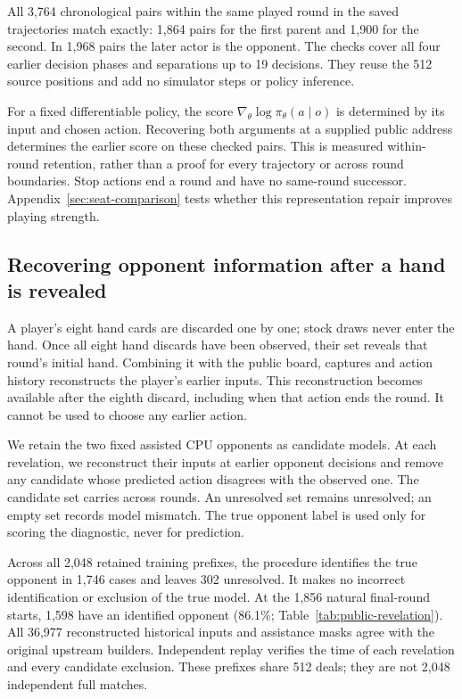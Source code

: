 All 3,764 chronological pairs within the same played round in the saved
trajectories match exactly: 1,864 pairs for the first parent and 1,900 for the
second. In 1,968 pairs the later actor is the opponent. The checks cover all
four earlier decision phases and separations up to 19 decisions. They reuse
the 512 source positions and add no simulator steps or policy inference.

For a fixed differentiable policy, the score
$\nabla_\theta\log\pi_\theta(a\mid o)$ is determined by its input and chosen
action. Recovering both arguments at a supplied public address determines the
earlier score on these checked pairs. This is measured within-round retention, rather than a
proof for every trajectory or across round boundaries. Stop actions end a round
and have no same-round successor. Appendix~\ref{sec:seat-comparison} tests whether this representation repair
improves playing strength.

\begin{samepage}
\subsection{Recovering opponent information after a hand is revealed}
\label{sec:public-revelation}
A player's eight hand cards are discarded one by one; stock draws never enter
the hand. Once all eight hand discards have been observed, their set reveals
that round's initial hand. Combining it with the public board, captures and
action history reconstructs the player's earlier inputs. This reconstruction
becomes available after the eighth discard, including when that action ends
the round. It cannot be used to choose any earlier action.
\end{samepage}

We retain the two fixed assisted CPU opponents as candidate models. At each
revelation, we reconstruct their inputs at earlier opponent decisions and
remove any candidate whose predicted action disagrees with the observed one.
The candidate set carries across rounds. An unresolved set remains unresolved;
an empty set records model mismatch. The true opponent label is used only for
scoring the diagnostic, never for prediction.

Across all 2,048 retained training prefixes, the procedure identifies the true
opponent in 1,746 cases and leaves 302 unresolved. It makes no incorrect
identification or exclusion of the true model. At the 1,856 natural final-round
starts, 1,598 have an identified opponent (86.1\%;
Table~\ref{tab:public-revelation}). All 36,977 reconstructed historical inputs
and assistance masks agree with the original upstream builders. Independent
replay verifies the time of each revelation and every candidate exclusion.
These prefixes share 512 deals; they are not 2,048 independent full matches.

